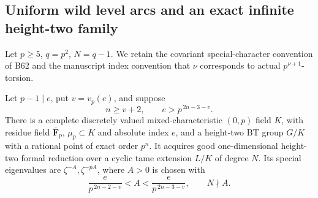\subsection{Uniform wild level arcs and an exact infinite height-two family}

Let $p\ge5$, $q=p^2$, $N=q-1$. We retain the covariant
special-character convention of B62 and the manuscript
index convention that $\nu$ corresponds to actual
$p^{\nu+1}$-torsion.

\begin{lemma}
\label{lem:B-RD101-arc}
Let $p-1\mid e$, put $v=v_p(e)$, and suppose
\[
                n\ge v+2,\qquad e>p^{\,2n-3-v}.
                                                        \tag{B-RD101.1}
\]
There is a complete discretely valued mixed-characteristic
$(0,p)$ field $K$, with residue field
$\overline{\mathbf F}_p$, $\mu_p\subset K$ and absolute
index $e$, and a height-two BT group $G/K$ with a rational
point of exact order $p^n$.
It acquires good one-dimensional height-two formal reduction
over a cyclic tame extension $L/K$ of degree $N$.
Its special eigenvalues are $\zeta^{-A},\zeta^{-pA}$,
where $A>0$ is chosen with
\[
 \frac{e}{p^{\,2n-2-v}}<A<
       \frac{e}{p^{\,2n-3-v}},\qquad N\nmid A.
                                                        \tag{B-RD101.2}
\]
\end{lemma}

